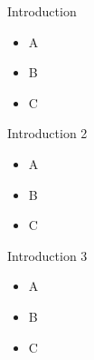 \begin{frame}{Introduction}
    \begin{itemize}
        \item A
        \item B
        \item C
    \end{itemize}
\end{frame}

\begin{frame}{Introduction 2}
    \begin{itemize}
        \item A
        \item B
        \item C
    \end{itemize}
\end{frame}

\begin{frame}{Introduction 3}
    \begin{itemize}
        \item A
        \item B
        \item C
    \end{itemize}
\end{frame}